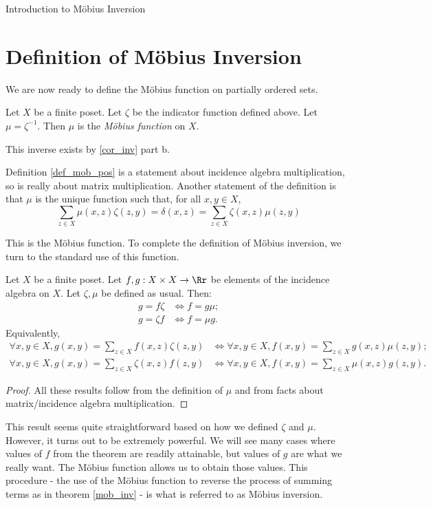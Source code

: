 \documentclass[12pt]{pom_thesis}
\begin{document}
\begin{chapter}{Introduction to M\"obius Inversion}
\section{Definition of M\"obius Inversion}
We are now ready to define the M\"obius function on partially ordered sets.
\begin{defn}\label{def_mob_pos}
Let $X$ be a finite poset. Let $\zeta$ be the indicator function defined above. Let $\mu = \zeta^{-1}$. Then $\mu$ is the \emph{M\"obius function} on $X$.
\end{defn}
\begin{rmk}
This inverse exists by \ref{cor_inv} part b. 
\end{rmk}
\begin{rmk}
Definition \ref{def_mob_pos} is a statement about incidence algebra multiplication, so is really about matrix multiplication. Another statement of the definition is that $\mu$ is the unique function such that, for all $x,y \in X$,
\[
\sum_{z \in X} \mu(x,z)\zeta(z,y) = \delta(x,z) = \sum_{z \in X} \zeta(x,z)\mu(z,y)
\]
\end{rmk}

This is the M\"obius function. To complete the definition of M\"obius inversion, we turn to the standard use of this function. 
\begin{thm}\label{mob_inv}
Let $X$ be a finite poset. Let $f, g: X \times X \rightarrow \Rr$ be elements of the incidence algebra on $X$. Let $\zeta, \mu$ be defined as usual. Then:
\begin{align*}
g = f \zeta &\iff f = g \mu;\\
g = \zeta f &\iff f = \mu g.
\end{align*}
Equivalently,
\begin{align*}
\forall x,y \in X, g(x,y) = \sum_{z \in X}f(x,z)\zeta(z,y) &\iff \forall x,y \in X, f(x,y) = \sum_{z \in X}g(x,z)\mu(z,y);\\
\forall x,y \in X, g(x,y) = \sum_{z \in X}\zeta(x,z)f(z,y) &\iff \forall x,y \in X, f(x,y) = \sum_{z \in X}\mu(x,z)g(z,y).
\end{align*}
\begin{proof}
All these results follow from the definition of $\mu$ and from facts about matrix/incidence algebra multiplication.
\end{proof}
\end{thm}
This result seems quite straightforward based on how we defined $\zeta$ and $\mu$. However, it turns out to be extremely powerful. We will see many cases where values of $f$ from the theorem are readily attainable, but values of $g$ are what we really want. The M\"obius function allows us to obtain those values. This procedure - the use of the M\"obius function to reverse the process of summing terms as in theorem \ref{mob_inv} - is what is referred to as M\"obius inversion.


\end{chapter}
\end{document}
